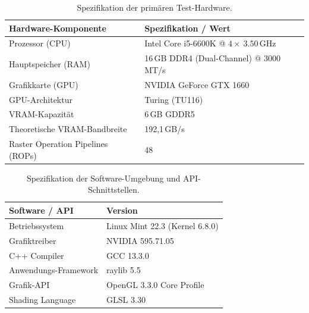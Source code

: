 \begin{table}[h]
    \centering
    \caption{Spezifikation der primären Test-Hardware.}
    \label{tab:hardware_specs}
    \renewcommand{\arraystretch}{1.2}
    \begin{tabularx}{\textwidth}{@{} l X @{}}
        \toprule
        \textbf{Hardware-Komponente}      & \textbf{Spezifikation / Wert}                      \\
        \midrule
        Prozessor (\ac{CPU})                   & Intel Core i5-6600K @ $4\times~3.50$\,GHz          \\
        Hauptspeicher (RAM)               & 16\,GB DDR4 (Dual-Channel) @ 3000\,MT/s            \\
        Grafikkarte (\ac{GPU})                 & NVIDIA GeForce GTX 1660                            \\
        \ac{GPU}-Architektur                   & Turing (TU116)                                     \\
        \ac{VRAM}-Kapazität                    & 6\,GB GDDR5                                        \\
        Theoretische \ac{VRAM}-Bandbreite      & 192,1\,GB/s                                        \\
        Raster Operation Pipelines (ROPs)             & 48                                                 \\
        \bottomrule
    \end{tabularx}
\end{table}

\begin{table}[h]
    \centering
    \caption{Spezifikation der Software-Umgebung und API-Schnittstellen.}
    \label{tab:software_specs}
    \renewcommand{\arraystretch}{1.2}
    \begin{tabularx}{\textwidth}{@{} l X @{}}
        \toprule
        \textbf{Software / \ac{API}} & \textbf{Version}               \\
        \midrule
        Betriebssystem          & Linux Mint 22.3 (Kernel 6.8.0) \\
        Grafiktreiber           & NVIDIA 595.71.05               \\
        C++ Compiler            & GCC 13.3.0                     \\
        Anwendungs-Framework    & raylib 5.5                     \\
        Grafik-\ac{API}             & OpenGL 3.3.0 Core Profile      \\
        Shading Language        & GLSL 3.30                      \\
        \bottomrule
    \end{tabularx}
\end{table}

